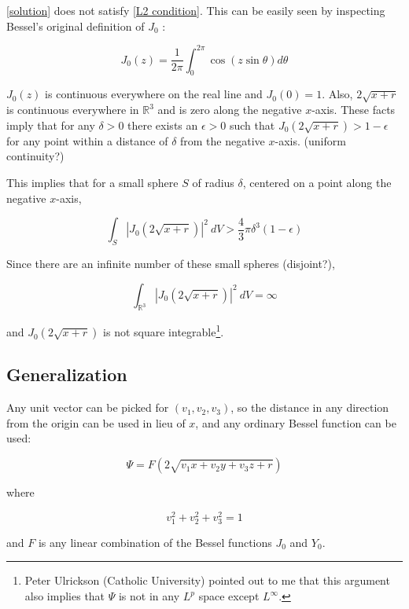 \documentclass{article}
\begin{document}
\eqref{solution} does not satisfy \eqref{L2 condition}.  This can be easily seen by inspecting
Bessel's original definition of $J_0$ \cite[p. 19]{Watson}:

\begin{equation}
\label{J0 definition}
J_0(z) = \frac{1}{2\pi}\int_0^{2\pi} \cos(z\sin\theta) d\theta
\end{equation}


$J_0(z)$ is continuous everywhere on the real line and $J_0(0)=1$.  Also, $2\sqrt{x+r}$ is continuous
everywhere in $\mathbb{R}^3$ and is zero along the negative $x$-axis.  These facts imply that for any
$\delta>0$ there exists an $\epsilon>0$ such that $J_0(2\sqrt{x+r}) > 1-\epsilon$ for any point within
a distance of $\delta$ from the negative $x$-axis. (uniform continuity?)

This implies that for a small sphere $S$ of radius $\delta$, centered on a point along the negative $x$-axis,

\[ \int_S \left|J_0(2\sqrt{x+r})\right|^2\  dV > \frac{4}{3}\pi\delta^3(1-\epsilon) \]

Since there are an infinite number of these small spheres (disjoint?),

\[ \int_{\mathbb{R}^3} \left|J_0(2\sqrt{x+r})\right|^2\ dV  = \infty \]

and $J_0(2\sqrt{x+r})$ is not square integrable\footnote{Peter Ulrickson (Catholic University) pointed out
to me that this argument also implies that $\Psi$ is not in any $L^p$ space except $L^\infty$.}.

\subsection*{Generalization}
\parskip 12pt

Any unit vector can be picked for $(v_1, v_2, v_3)$,
so the distance in any direction from the origin can be used in lieu of $x$,
and any ordinary Bessel function can be used:

\begin{equation}
\label{generalized solution}
\Psi = F(2\sqrt{v_1 x+ v_2 y+ v_3 z+r})
\end{equation}

where

\begin{equation*}
v_1^2+v_2^2+v_3^2=1
\end{equation*}

and $F$ is any linear combination of the Bessel functions $J_0$ and $Y_0$.
\end{document}
